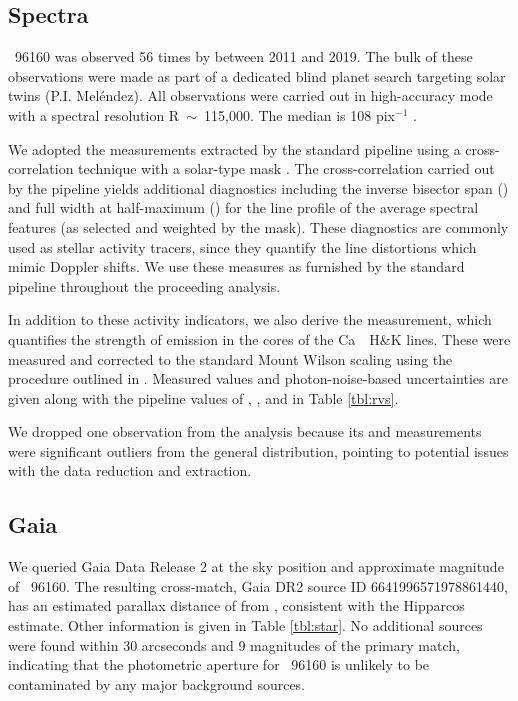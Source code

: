 \documentclass[modern]{aastex62}
\newcommand{\hoststar}{\acronym{HIP}\ 96160\xspace}
\begin{document}
\subsection{Spectra}
\label{s:data:rvs}

\hoststar was observed 56 times by \HARPS between 2011 and 2019. 
The bulk of these observations were made as part of a dedicated blind planet search targeting solar twins (P.I. Mel\'endez). 
All observations were carried out in high-accuracy mode with a spectral resolution R~$\sim$~115,000. 
The median \SNR is 108 pix$^{-1}$ . 

We adopted the \RV measurements extracted by the standard \HARPS pipeline using a cross-correlation technique with a solar-type mask \citep{Pepe2002}. 
The cross-correlation carried out by the pipeline yields additional diagnostics including the inverse bisector span (\BIS) and full width at half-maximum (\FWHM) for the line profile of the average spectral features (as selected and weighted by the mask). 
These diagnostics are commonly used as stellar activity tracers, since they quantify the line distortions which mimic Doppler shifts. 
We use these measures as furnished by the standard pipeline throughout the proceeding analysis.

In addition to these activity indicators, we also derive the \shk measurement, which quantifies the strength of emission in the cores of the Ca~\II~H\&K lines.
These were measured and corrected to the standard Mount Wilson scaling using the procedure outlined in \citet{Lovis2009}. 
Measured \shk values and photon-noise-based uncertainties are given along with the pipeline values of \RV, \BIS, and \FWHM in Table \ref{tbl:rvs}.

We dropped one observation from the analysis because its \BIS and \FWHM measurements were significant outliers from the general distribution, pointing to potential issues with the data reduction and \RV extraction.

\subsection{Gaia}

We queried Gaia Data Release 2 \citep{gaia} at the sky position and approximate magnitude of \hoststar. 
The resulting cross-match, Gaia DR2 source ID 6641996571978861440, has an estimated parallax distance of  from \citet{BailerJones}, consistent with the Hipparcos estimate. 
Other \gaia information is given in Table \ref{tbl:star}. 
No additional sources were found within 30 arcseconds and 9 magnitudes of the primary match, indicating that the \TESS photometric aperture for \hoststar is unlikely to be contaminated by any major background sources.
\end{document}
